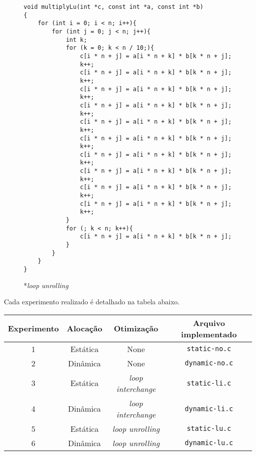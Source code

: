 \begin{figure}[H]
\begin{verbatim}
void multiplyLu(int *c, const int *a, const int *b)
{
    for (int i = 0; i < n; i++){
        for (int j = 0; j < n; j++){
            int k;
            for (k = 0; k < n / 10;){
                c[i * n + j] = a[i * n + k] * b[k * n + j];
                k++;
                c[i * n + j] = a[i * n + k] * b[k * n + j];
                k++;
                c[i * n + j] = a[i * n + k] * b[k * n + j];
                k++;
                c[i * n + j] = a[i * n + k] * b[k * n + j];
                k++;
                c[i * n + j] = a[i * n + k] * b[k * n + j];
                k++;
                c[i * n + j] = a[i * n + k] * b[k * n + j];
                k++;
                c[i * n + j] = a[i * n + k] * b[k * n + j];
                k++;
                c[i * n + j] = a[i * n + k] * b[k * n + j];
                k++;
                c[i * n + j] = a[i * n + k] * b[k * n + j];
                k++;
                c[i * n + j] = a[i * n + k] * b[k * n + j];
                k++;
            }
            for (; k < n; k++){
                c[i * n + j] = a[i * n + k] * b[k * n + j];
            }
        }
    }
}
\end{verbatim}
*{\small \textit{loop unrolling}}
\end{figure}
Cada experimento realizado é detalhado na tabela abaixo.

\begin{table}[H]
\centering
\begin{tabular}{|c|c|c|c|}
    \hline \textbf{Experimento} & \textbf{Alocação} & \textbf{Otimização} & \textbf{Arquivo implementado} \\
    \hline 1 & Estática & None & \texttt{static-no.c} \\
    \hline 2 & Dinâmica & None & \texttt{dynamic-no.c} \\
    \hline 3 & Estática & \textit{loop interchange} & \texttt{static-li.c} \\
    \hline 4 & Dinâmica & \textit{loop interchange} & \texttt{dynamic-li.c} \\
    \hline 5 & Estática & \textit{loop unrolling} & \texttt{static-lu.c} \\
    \hline 6 & Dinâmica & \textit{loop unrolling} & \texttt{dynamic-lu.c} \\
    \hline
\end{tabular}
\end{table}
    

